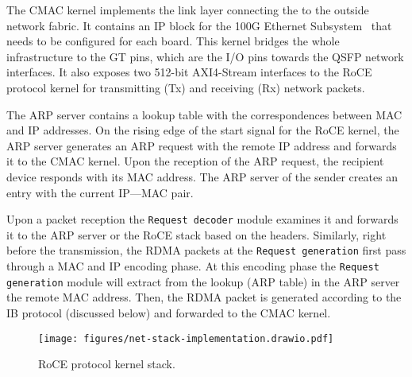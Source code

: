  The CMAC kernel implements the link layer connecting the \projecttitle{} to the outside network fabric. It contains an IP block for the 100G Ethernet Subsystem~\cite{license} that needs to be configured for each board. This kernel bridges the whole infrastructure to the GT pins, which are the I/O pins towards the QSFP network interfaces. It also exposes two 512-bit AXI4-Stream interfaces to the RoCE protocol kernel for transmitting (Tx) and receiving (Rx) network packets. 

  The ARP server contains a lookup table with the correspondences
between MAC and IP addresses.  On the rising edge of the start signal for the \projecttitle{} RoCE kernel, the ARP server generates an ARP request with the remote IP address and forwards it to the CMAC kernel. Upon the reception of the ARP request, the recipient \projecttitle{} device responds with its MAC address. The ARP server of the sender creates an entry with the current IP---MAC pair.

Upon a packet reception the {\tt Request decoder} module examines it and forwards it to the ARP server or the RoCE stack based on the headers. Similarly, right before the transmission, the RDMA packets at the {\tt Request generation} first pass through a MAC and IP encoding phase. At this encoding phase the {\tt Request generation} module will extract from the lookup (ARP table) in the ARP server the remote MAC address. Then, the RDMA packet is generated according to the IB protocol (discussed below) and forwarded to the CMAC kernel.



\begin{figure}[t!]
    \centering
    \texttt{[image: figures/net-stack-implementation.drawio.pdf]}
    \caption{\projecttitle{} RoCE protocol kernel stack.}
    \label{fig:ib_protocol}
\end{figure}
%

